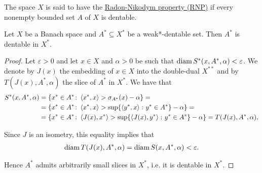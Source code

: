 \begin{definition}\cite[definition 5.2]{Phelps1993}
  \label{def:radon-nikodym-property}
  The space $X$ is said to have the \uline{Radon-Nikodym property (RNP)} if every nonempty bounded set $A$ of $X$ is dentable.
\end{definition}

\begin{proposition}
  \label{thm:weak_dentable_sets_are_dentable}
  Let $X$ be a Banach space and $A^* \subseteq X^*$ be a weak*-dentable set. Then $A^*$ is dentable in $X^*$.
\end{proposition}
\begin{proof}
  Let $\varepsilon > 0$ and let $x \in X$ and $\alpha > 0$ be such that $\operatorname{diam} S^*(x, A^*, \alpha) < \varepsilon$.
  We denote by $J(x)$ the embedding of $x \in X$ into the double-dual $X^{**}$ and by $T(J(x), A^*, \alpha)$ the slice of $A^*$ in $X^*$. We have that
  \begin{align*}
    S^*(x, A^*, \alpha)
    &=
    \{ x^* \in A^* \colon \left\langle x^*, x \right\rangle > \sigma_{A^*}(x) - \alpha \}
    = \\ &=
    \{ x^* \in A^* \colon \left\langle x^*, x \right\rangle > \sup \{ \left\langle y^*, x \right\rangle \colon y^* \in A^* \} - \alpha \}
    = \\ &=
    \{ x^* \in A^* \colon \left\langle J(x), x^* \right\rangle > \sup \{ \left\langle J(x), y^* \right\rangle \colon y^* \in A^* \} - \alpha \}
    =
    T(J(x), A^*, \alpha),
  \end{align*}

  Since $J$ is an isometry, this equality implies that
  \begin{align*}
    \operatorname{diam} T(J(x), A^*, \alpha) = \operatorname{diam} S(x, A^*, \alpha) < \varepsilon.
  \end{align*}

  Hence $A^*$ admits arbitrarily small slices in $X^*$, i.e. it is dentable in $X^*$.
\end{proof}
